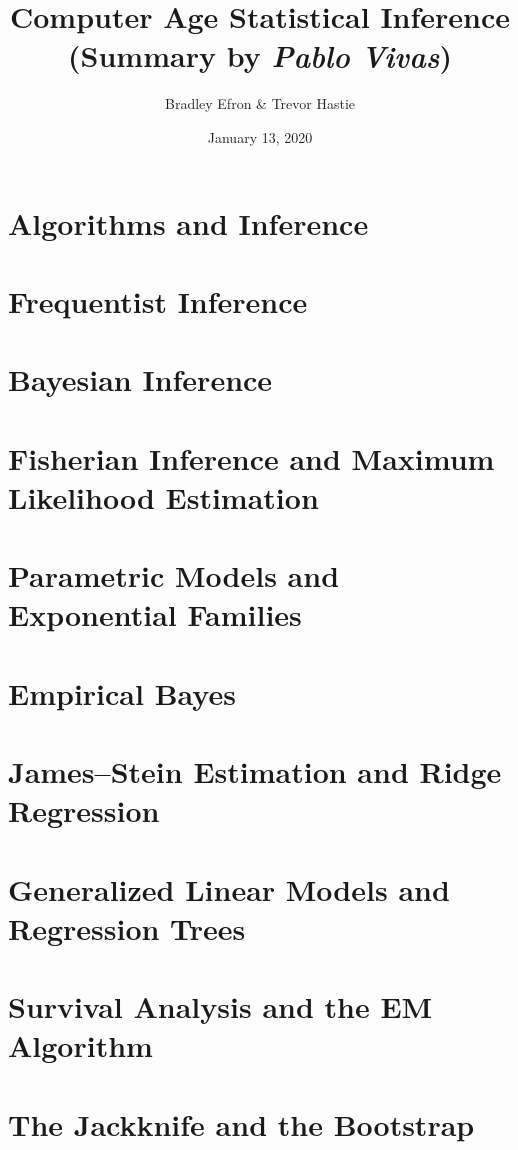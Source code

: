\documentclass[12pt,a4paper]{article}
\author{Bradley Efron \& Trevor Hastie}
\title{Computer Age Statistical Inference\\
\large{(Summary by \textit{Pablo Vivas})}}
\date{January 13, 2020}
\begin{document}
\maketitle
\section{Algorithms and Inference}

\section{Frequentist Inference}

\section{Bayesian Inference}

\section{Fisherian Inference and Maximum Likelihood Estimation}

\section{Parametric Models and Exponential Families}

\section{Empirical Bayes}

\section{James–Stein Estimation and Ridge Regression}

\section{Generalized Linear Models and Regression Trees}

\section{Survival Analysis and the EM Algorithm}

\section{The Jackknife and the Bootstrap}
\end{document}

